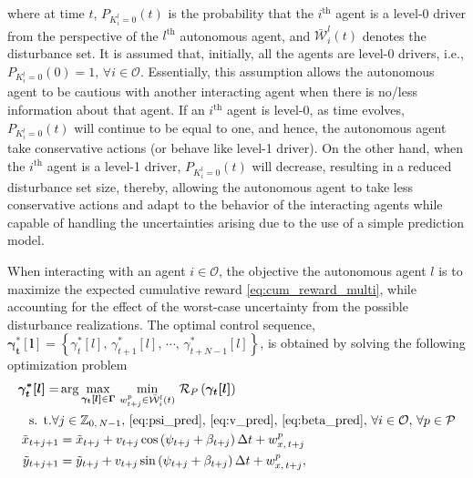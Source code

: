 \documentclass[10pt,journal]{IEEEtran}
\newcommand{\nth}[1]{$#1^{\textrm{th}}$}
\newcommand{\optactseq}[1]{\boldsymbol{\gamma^{*}_{t}[#1]} = \left\{\gamma^{*}_{t}[#1],\,\gamma^{*}_{t+1}[#1],\,\cdots,\,\gamma^{*}_{t+N-1}[#1]\right\}}
\begin{document}
	\noindent where at time $t$, $P_{K_{i}^l = 0} (t) $ is the probability that the \nth{i} agent is a level-0 driver from the perspective of the \nth{l} autonomous agent, and $\bar{\mathcal{W}}_{i}^{l}(t)$ denotes the disturbance set. It is assumed that, initially, all the agents are level-0 drivers, i.e., $P_{K_{i}^l = 0} (0) = 1,\, \forall i \in \mathcal{O}$. Essentially, this assumption allows the autonomous agent to be cautious with another interacting agent when there is no/less information about that agent. If an \nth{i} agent is level-0, as time evolves, $P_{K_{i}^l = 0} (t)$ will continue to be equal to one, and hence, the autonomous agent take conservative actions (or behave like level-1 driver). On the other hand, when the \nth{i} agent is a level-1 driver, $P_{K_{i}^l = 0} (t)$ will decrease, resulting in a reduced disturbance set size, thereby, allowing the autonomous agent to take less conservative actions and adapt to the behavior of the interacting agents while capable of handling the uncertainties arising due to the use of a simple prediction model. 

	When interacting with an agent $i\in \mathcal{O}$, the objective the autonomous agent $l$ is to maximize the expected cumulative reward \eqref{eq:cum_reward_multi}, while accounting for the effect of the worst-case uncertainty from the possible disturbance realizations. The optimal control sequence, $\optactseq{l}$, is obtained by solving the following optimization problem
	\begin{subequations}
		\begin{align}
			\boldsymbol{\gamma^{*}_{t}[l]} =  & \arg \underset {\boldsymbol{\gamma_{t}[l]} \in  \boldsymbol{\Gamma}} {\max}\, \, \underset{w_{t+j}^{p} \in \bar{\mathcal{W}}_{i}^{l}(t)}{\min} \, \, \mathcal{R}_P\left(\boldsymbol{\gamma_{t}[l]}\right) \\
			\textrm{s. t.} \forall &  j \in \mathbb{Z}_{0,\,N-1},\, \eqref{eq:psi_pred},\, \eqref{eq:v_pred},\, \eqref{eq:beta_pred} ,\,\forall i \in \mathcal{O},\, \forall p \in \mathcal{P} \nonumber \\
			\tilde{x}_{t+j+1} & = 	\tilde{x}_{t+j} + v_{t+j} \cos\left(\psi_{t+j} + \beta_{t+j} \right) \Delta t + w_{x,\,t+j}^{p}\\ 
			\tilde{y}_{t+j+1} & = 	\tilde{y}_{t+j} + v_{t+j} \sin\left(\psi_{t+j} + \beta_{t+j} \right) \Delta t + w_{x,\,t+j}^{p},
			\label{eq:control_action_model}
		\end{align}
		\label{eq:control_prob}
	\end{subequations}
\end{document}

